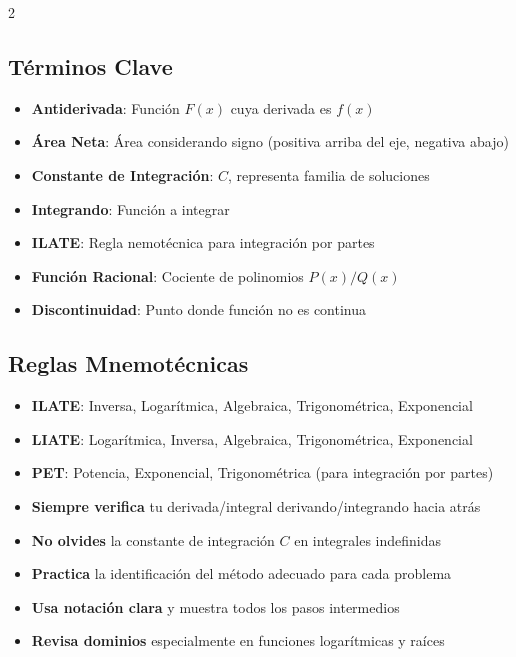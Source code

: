 \documentclass{article}
\newcommand{\highlight}[1]{\textbf{#1}}
\newcommand{\formula}[1]{\ensuremath{#1}}
\begin{document}
\begin{multicols}{2}
\subsection*{Términos Clave}
\begin{itemize}
    \item \highlight{Antiderivada}: Función \formula{F(x)} cuya derivada es \formula{f(x)}
    \item \highlight{Área Neta}: Área considerando signo (positiva arriba del eje, negativa abajo)
    \item \highlight{Constante de Integración}: \formula{C}, representa familia de soluciones
    \item \highlight{Integrando}: Función a integrar
    \item \highlight{ILATE}: Regla nemotécnica para integración por partes
    \item \highlight{Función Racional}: Cociente de polinomios \formula{P(x)/Q(x)}
    \item \highlight{Discontinuidad}: Punto donde función no es continua
\end{itemize}

\columnbreak

\subsection*{Reglas Mnemotécnicas}
\begin{itemize}
    \item \highlight{ILATE}: Inversa, Logarítmica, Algebraica, Trigonométrica, Exponencial
    \item \highlight{LIATE}: Logarítmica, Inversa, Algebraica, Trigonométrica, Exponencial
    \item \highlight{PET}: Potencia, Exponencial, Trigonométrica (para integración por partes)
\end{itemize}
\end{multicols}

\begin{infobox}[title=\textbf{Consejos Prácticos}]
\begin{itemize}
    \item \textbf{Siempre verifica} tu derivada/integral derivando/integrando hacia atrás
    \item \textbf{No olvides} la constante de integración \formula{C} en integrales indefinidas
    \item \textbf{Practica} la identificación del método adecuado para cada problema
    \item \textbf{Usa notación clara} y muestra todos los pasos intermedios
    \item \textbf{Revisa dominios} especialmente en funciones logarítmicas y raíces
\end{itemize}
\end{infobox}
\end{document}
